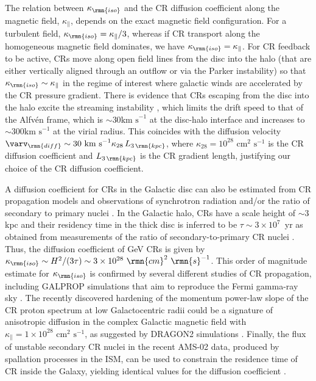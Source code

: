 \documentclass[useAMS,usenatbib]{mnras}
\begin{document}
The relation between $\kappa_\rmn{iso}$ and the CR diffusion coefficient along the magnetic field, $\kappa_\parallel$, depends on the exact magnetic field configuration. For a turbulent field, $\kappa_\rmn{iso} = \kappa_\parallel/3$, whereas if CR transport along the homogeneous magnetic field dominates, we have $\kappa_\rmn{iso} = \kappa_\parallel$. For CR feedback to be active, CRs move along open field lines from the disc into the halo (that are either vertically aligned through an outflow or via the Parker instability) so that $\kappa_\rmn{iso} \sim \kappa_\parallel$ in the regime of interest where galactic winds are accelerated by the CR pressure gradient. There is evidence that CRs escaping from the disc into the halo excite the streaming instability \citep{Kulsrud1969,Evoli2018}, which limits the drift speed to that of the Alfv{\'e}n frame, which is $\sim30\mbox{km s}^{-1}$ at the disc-halo interface and increases to $\sim 300\mbox{km s}^{-1}$ at the virial radius. This coincides with the diffusion velocity $\varv_\rmn{diff}\sim30\mbox{ km s}^{-1} \kappa_{28}\, L_{3\,\rmn{kpc}}$, where $\kappa_{28}=10^{28}\mbox{ cm}^2\mbox{ s}^{-1}$ is the CR diffusion coefficient and $L_{3\,\rmn{kpc}}$ is the CR gradient length, justifying our choice of the CR diffusion coefficient.

A diffusion coefficient for CRs in the Galactic disc can also be estimated from CR propagation models and observations of synchrotron radiation and/or the ratio of secondary to primary nuclei \citep{Strong1998,Ptuskin2006,Ackermann2012,Tabatabaei2013,Amato2018}. In the Galactic halo, CRs have a scale height of $\sim3$ kpc and their residency time in the thick disc is inferred to be $\tau\sim3\times10^7$~yr as obtained from measurements of the ratio of secondary-to-primary CR nuclei \citep{Lipari2014,Evoli2020}. Thus, the diffusion coefficient of GeV CRs is given by $\kappa_\rmn{iso}\sim H^2/(3\tau)\sim3\times10^{28}~\rmn{cm}^2~\rmn{s}^{-1}$. This order of magnitude estimate for $\kappa_\rmn{iso}$ is confirmed by several different studies of CR propagation, including GALPROP simulations that aim to reproduce the Fermi gamma-ray sky \citep{Porter2017,Johannesson2019}. The recently discovered hardening of the momentum power-law slope of the CR proton spectrum at low Galactocentric radii could be a signature of anisotropic diffusion in the complex Galactic magnetic field with $\kappa_\parallel=1\times10^{28}\mbox{ cm}^2\mbox{ s}^{-1}$, as suggested by DRAGON2 simulations \citep{Cerri2017,Evoli2017}. Finally, the flux of unstable secondary CR nuclei in the recent AMS-02 data, produced by spallation processes in the ISM, can be used to constrain the residence time of CR inside the Galaxy, yielding identical values for the diffusion coefficient \citep{Evoli2019,Evoli2020}.
\end{document}
